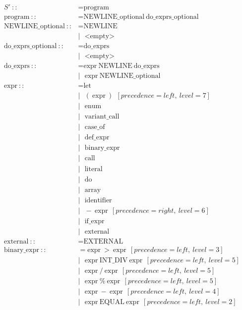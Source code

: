 \documentclass{article}
\begin{document}
\allowdisplaybreaks
\begin{align*}
  S'\ ::&= \text{program}\\
  \text{program}\ ::&= \text{NEWLINE\_optional}\ \text{do\_exprs\_optional}\\
  \text{NEWLINE\_optional}\ ::&= \text{NEWLINE}\\
    &|\ \ \ \text{<empty>}\\
  \text{do\_exprs\_optional}\ ::&= \text{do\_exprs}\\
    &|\ \ \ \text{<empty>}\\
  \text{do\_exprs}\ ::&= \text{expr}\ \text{NEWLINE}\ \text{do\_exprs}\\
    &|\ \ \ \text{expr}\ \text{NEWLINE\_optional}\\
  \text{expr}\ ::&= \text{let}\\
    &|\ \ \ (\ \text{expr}\ )\ \ [precedence=left,\ level=7]\\
    &|\ \ \ \text{enum}\\
    &|\ \ \ \text{variant\_call}\\
    &|\ \ \ \text{case\_of}\\
    &|\ \ \ \text{def\_expr}\\
    &|\ \ \ \text{binary\_expr}\\
    &|\ \ \ \text{call}\\
    &|\ \ \ \text{literal}\\
    &|\ \ \ \text{do}\\
    &|\ \ \ \text{array}\\
    &|\ \ \ \text{identifier}\\
    &|\ \ \ -\ \text{expr}\ \ [precedence=right,\ level=6]\\
    &|\ \ \ \text{if\_expr}\\
    &|\ \ \ \text{external}\\
  \text{external}\ ::&= \text{EXTERNAL}\\
  \text{binary\_expr}\ ::&= \text{expr}\ >\ \text{expr}\ \ [precedence=left,\ level=3]\\
    &|\ \ \ \text{expr}\ \text{INT\_DIV}\ \text{expr}\ \ [precedence=left,\ level=5]\\
    &|\ \ \ \text{expr}\ /\ \text{expr}\ \ [precedence=left,\ level=5]\\
    &|\ \ \ \text{expr}\ \%\ \text{expr}\ \ [precedence=left,\ level=5]\\
    &|\ \ \ \text{expr}\ -\ \text{expr}\ \ [precedence=left,\ level=4]\\
    &|\ \ \ \text{expr}\ \text{EQUAL}\ \text{expr}\ \ [precedence=left,\ level=2]\\

\end{align*}
\end{document}
